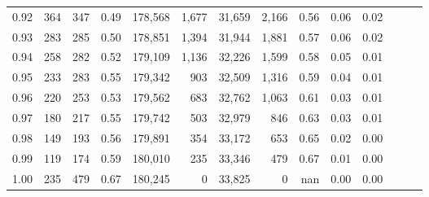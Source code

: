 \begin{tabular}{rrrrrrrrrrrrrr}
0.92 &    364 &  347 &  0.49 &  178,568 &    1,677 &  31,659 &   2,166 &  0.56 &  0.06 &      0.02 \\
0.93 &    283 &  285 &  0.50 &  178,851 &    1,394 &  31,944 &   1,881 &  0.57 &  0.06 &      0.02 \\
0.94 &    258 &  282 &  0.52 &  179,109 &    1,136 &  32,226 &   1,599 &  0.58 &  0.05 &      0.01 \\
0.95 &    233 &  283 &  0.55 &  179,342 &      903 &  32,509 &   1,316 &  0.59 &  0.04 &      0.01 \\
0.96 &    220 &  253 &  0.53 &  179,562 &      683 &  32,762 &   1,063 &  0.61 &  0.03 &      0.01 \\
0.97 &    180 &  217 &  0.55 &  179,742 &      503 &  32,979 &     846 &  0.63 &  0.03 &      0.01 \\
0.98 &    149 &  193 &  0.56 &  179,891 &      354 &  33,172 &     653 &  0.65 &  0.02 &      0.00 \\
0.99 &    119 &  174 &  0.59 &  180,010 &      235 &  33,346 &     479 &  0.67 &  0.01 &      0.00 \\
1.00 &    235 &  479 &  0.67 &  180,245 &        0 &  33,825 &       0 &   nan &  0.00 &      0.00 \\
\bottomrule
\end{tabular}
